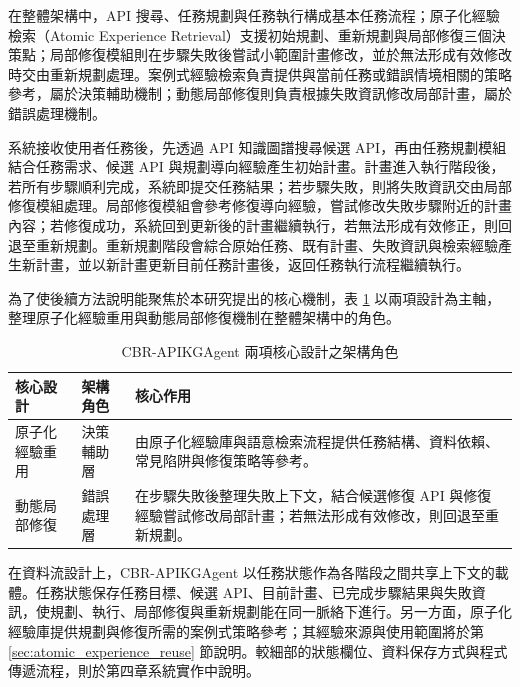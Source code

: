 \begin{ZhChapter}
在整體架構中，API 搜尋、任務規劃與任務執行構成基本任務流程；原子化經驗檢索（Atomic Experience Retrieval）支援初始規劃、重新規劃與局部修復三個決策點；局部修復模組則在步驟失敗後嘗試小範圍計畫修改，並於無法形成有效修改時交由重新規劃處理。案例式經驗檢索負責提供與當前任務或錯誤情境相關的策略參考，屬於決策輔助機制；動態局部修復則負責根據失敗資訊修改局部計畫，屬於錯誤處理機制。

系統接收使用者任務後，先透過 API 知識圖譜搜尋候選 API，再由任務規劃模組結合任務需求、候選 API 與規劃導向經驗產生初始計畫。計畫進入執行階段後，若所有步驟順利完成，系統即提交任務結果；若步驟失敗，則將失敗資訊交由局部修復模組處理。局部修復模組會參考修復導向經驗，嘗試修改失敗步驟附近的計畫內容；若修復成功，系統回到更新後的計畫繼續執行，若無法形成有效修正，則回退至重新規劃。重新規劃階段會綜合原始任務、既有計畫、失敗資訊與檢索經驗產生新計畫，並以新計畫更新目前任務計畫後，返回任務執行流程繼續執行。

為了使後續方法說明能聚焦於本研究提出的核心機制，表 \ref{tab:cbr_apikgagent_components} 以兩項設計為主軸，整理原子化經驗重用與動態局部修復機制在整體架構中的角色。

\begin{table}[htbp]
    \centering
    \caption{CBR-APIKGAgent 兩項核心設計之架構角色}
    \label{tab:cbr_apikgagent_components}
    \small
    \renewcommand{\arraystretch}{1.25}
    \begin{tabularx}{0.95\textwidth}{
        >{\raggedright\arraybackslash}p{}
        >{\raggedright\arraybackslash}p{}
        >{\raggedright\arraybackslash}X
    }
        \hline
        \textbf{核心設計} & \textbf{架構角色} & \textbf{核心作用} \\
        \hline
        原子化經驗重用 &
        決策輔助層 &
        由原子化經驗庫與語意檢索流程提供任務結構、資料依賴、常見陷阱與修復策略等參考。 \\[0.45em]
        動態局部修復 &
        錯誤處理層 &
        在步驟失敗後整理失敗上下文，結合候選修復 API 與修復經驗嘗試修改局部計畫；若無法形成有效修改，則回退至重新規劃。 \\
        \hline
    \end{tabularx}
\end{table}

在資料流設計上，CBR-APIKGAgent 以任務狀態作為各階段之間共享上下文的載體。任務狀態保存任務目標、候選 API、目前計畫、已完成步驟結果與失敗資訊，使規劃、執行、局部修復與重新規劃能在同一脈絡下進行。另一方面，原子化經驗庫提供規劃與修復所需的案例式策略參考；其經驗來源與使用範圍將於第 \ref{sec:atomic_experience_reuse} 節說明。較細部的狀態欄位、資料保存方式與程式傳遞流程，則於第四章系統實作中說明。


\end{ZhChapter}
